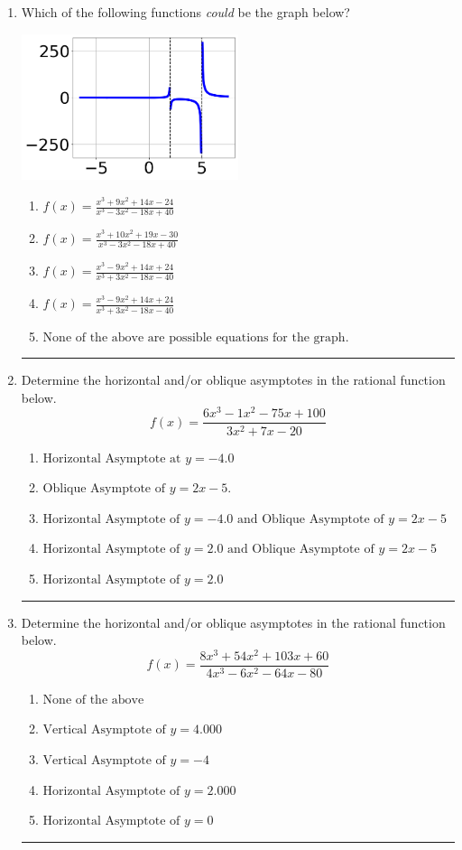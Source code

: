 \documentclass[14pt]{extbook}
\newcommand{\litem}[1]{\item#1\hspace*{-1cm}\rule{\textwidth}{0.4pt}}
\begin{document}
\begin{enumerate}
{\begin{enumerate}[label=\Alph*.]
\end{enumerate} }
\litem{
Which of the following functions \textit{could} be the graph below?
\begin{center}
    \includegraphics[width=0.5\textwidth]{../Figures/identifyGraphOfRationalFunctionCopyC.png}
\end{center}
\begin{enumerate}[label=\Alph*.]
\item \( f(x)=\frac{x^{3} +9 x^{2} +14 x -24}{x^{3} -3 x^{2} -18 x + 40} \)
\item \( f(x)=\frac{x^{3} +10 x^{2} +19 x -30}{x^{3} -3 x^{2} -18 x + 40} \)
\item \( f(x)=\frac{x^{3} -9 x^{2} +14 x + 24}{x^{3} +3 x^{2} -18 x -40} \)
\item \( f(x)=\frac{x^{3} -9 x^{2} +14 x + 24}{x^{3} +3 x^{2} -18 x -40} \)
\item \( \text{None of the above are possible equations for the graph.} \)

\end{enumerate} }
\litem{
Determine the horizontal and/or oblique asymptotes in the rational function below.\[ f(x) = \frac{6x^{3} -1 x^{2} -75 x + 100}{3x^{2} +7 x -20} \]\begin{enumerate}[label=\Alph*.]
\item \( \text{Horizontal Asymptote at } y = -4.0 \)
\item \( \text{Oblique Asymptote of } y = 2x -5. \)
\item \( \text{Horizontal Asymptote of } y = -4.0 \text{ and Oblique Asymptote of } y = 2x -5 \)
\item \( \text{Horizontal Asymptote of } y = 2.0 \text{ and Oblique Asymptote of } y = 2x -5 \)
\item \( \text{Horizontal Asymptote of } y = 2.0  \)

\end{enumerate} }
\litem{
Determine the horizontal and/or oblique asymptotes in the rational function below.\[ f(x) = \frac{8x^{3} +54 x^{2} +103 x + 60}{4x^{3} -6 x^{2} -64 x -80} \]\begin{enumerate}[label=\Alph*.]
\item \( \text{None of the above} \)
\item \( \text{Vertical Asymptote of } y = 4.000  \)
\item \( \text{Vertical Asymptote of } y = -4  \)
\item \( \text{Horizontal Asymptote of } y = 2.000  \)
\item \( \text{Horizontal Asymptote of } y = 0  \)


\end{enumerate}}
\end{enumerate}
\end{document}

